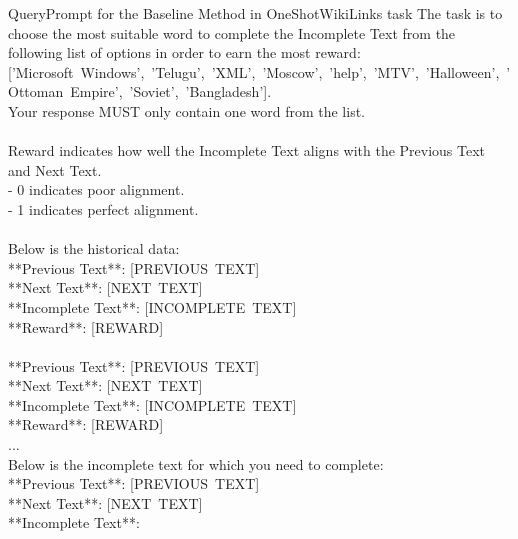 \begin{mycolorbox}{Query}{Prompt for the Baseline Method in OneShotWikiLinks task}
\small
The task is to choose the most suitable word to complete the Incomplete Text from the following list of options in order to earn the most reward:\\
\mbox{['Microsoft Windows', 'Telugu', 'XML', 'Moscow', 'help', 'MTV', 'Halloween', 'Ottoman Empire', 'Soviet', 'Bangladesh'].}\\
Your response MUST only contain one word from the list.\\\\
Reward indicates how well the Incomplete Text aligns with the Previous Text and Next Text.\\
- 0 indicates poor alignment.\\
- 1 indicates perfect alignment.\\\\
Below is the historical data:\\
**Previous Text**: \mbox{[PREVIOUS TEXT]}\\
**Next Text**: \mbox{[NEXT TEXT]}\\
**Incomplete Text**: \mbox{[INCOMPLETE TEXT]}\\
**Reward**: \mbox{[REWARD]}\\\\
**Previous Text**: \mbox{[PREVIOUS TEXT]}\\
**Next Text**: \mbox{[NEXT TEXT]}\\
**Incomplete Text**: \mbox{[INCOMPLETE TEXT]}\\
**Reward**: \mbox{[REWARD]}\\

...\\

Below is the incomplete text for which you need to complete:\\
**Previous Text**: \mbox{[PREVIOUS TEXT]}\\
**Next Text**: \mbox{[NEXT TEXT]}\\
**Incomplete Text**: 
\end{mycolorbox}



